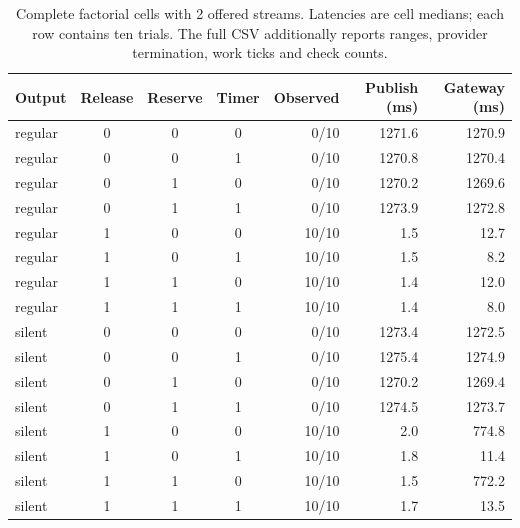 \begin{table}[ht]\centering\small\begin{tabular}{@{}lccc r r r@{}}
\toprule Output & Release & Reserve & Timer & Observed & Publish (ms) & Gateway (ms)\\\midrule
regular & 0 & 0 & 0 & 0/10 & 1271.6 & 1270.9 \\
regular & 0 & 0 & 1 & 0/10 & 1270.8 & 1270.4 \\
regular & 0 & 1 & 0 & 0/10 & 1270.2 & 1269.6 \\
regular & 0 & 1 & 1 & 0/10 & 1273.9 & 1272.8 \\
regular & 1 & 0 & 0 & 10/10 & 1.5 & 12.7 \\
regular & 1 & 0 & 1 & 10/10 & 1.5 & 8.2 \\
regular & 1 & 1 & 0 & 10/10 & 1.4 & 12.0 \\
regular & 1 & 1 & 1 & 10/10 & 1.4 & 8.0 \\
silent & 0 & 0 & 0 & 0/10 & 1273.4 & 1272.5 \\
silent & 0 & 0 & 1 & 0/10 & 1275.4 & 1274.9 \\
silent & 0 & 1 & 0 & 0/10 & 1270.2 & 1269.4 \\
silent & 0 & 1 & 1 & 0/10 & 1274.5 & 1273.7 \\
silent & 1 & 0 & 0 & 10/10 & 2.0 & 774.8 \\
silent & 1 & 0 & 1 & 10/10 & 1.8 & 11.4 \\
silent & 1 & 1 & 0 & 10/10 & 1.5 & 772.2 \\
silent & 1 & 1 & 1 & 10/10 & 1.7 & 13.5 \\
\bottomrule\end{tabular}\caption{Complete factorial cells with 2 offered streams. Latencies are cell medians; each row contains ten trials. The full CSV additionally reports ranges, provider termination, work ticks and check counts.}\end{table}
